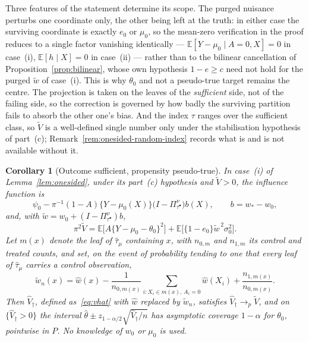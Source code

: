 \documentclass[11pt]{article}
\theoremstyle{plain}
\newtheorem{corollary}[theorem]{Corollary}
\theoremstyle{definition}
\theoremstyle{remark}
\newcommand{\E}{\mathbb{E}}
\newcommand{\ez}{e_0}
\newcommand{\mz}{\mu_0}
\newcommand{\wz}{w_0}
\newcommand{\what}{\widehat{w}}
\newcommand{\that}{\widehat{\tau}}
\newcommand{\thetahat}{\widehat{\theta}}
\newcommand{\Vhat}{\widehat{V}}
\newcommand{\wtil}{\widetilde{w}}
\newcommand{\Vtil}{\widetilde{V}}
\begin{document}
\noindent Three features of the statement determine its scope. The purged
nuisance perturbs one coordinate only, the other being left at the truth: in
either case the surviving coordinate is exactly $\ez$ or $\mz$, so the mean-zero
verification in the proof reduces to a single factor vanishing identically ---
$\E[Y-\mz\mid A=0,X]=0$ in case~(i), $\E[h\mid X]=0$ in case~(ii) --- rather than
to the bilinear cancellation of Proposition~\ref{prop:bilinear}, whose own
hypothesis $1-e\ge c$ need not hold for the purged $\wtil$ of case~(i). This is
why $\theta_0$ and not a pseudo-true target remains the
centre. The projection is taken on the leaves of the \emph{sufficient} side, not
of the failing side, so the correction is governed by how badly the surviving
partition fails to absorb the other one's bias. And the index $\tau$ ranges over
the sufficient class, so $\Vtil$ is a well-defined single number only under the
stabilisation hypothesis of part~(c); Remark~\ref{rem:onesided-random-index}
records what is and is not available without it.

\begin{corollary}[Outcome sufficient, propensity pseudo-true]
\label{cor:onesided-mu}
In case~(i) of Lemma~\ref{lem:onesided}, under its part~(c) hypothesis and
$\Vtil>0$, the
influence function is
\[
  \psi_0-\pi^{-1}(1-A)\{Y-\mz(X)\}
   \bigl(I-\Pi^\nu_{\tau^\bullet}\bigr)b(X),
  \qquad b=w_*-\wz,
\]
and, with $\wtil=\wz+(I-\Pi^\nu_{\tau^\bullet})b$,
\[
  \pi^2\Vtil=\E\bigl[A\{Y-\mz-\theta_0\}^2\bigr]
   +\E\bigl[\{1-\ez\}\wtil^{\,2}\sigma_0^2\bigr].
\]
Let $m(x)$ denote the leaf of $\that_\mu$ containing $x$, with $n_{0,m}$ and
$n_{1,m}$ its control and treated counts, and set, on the event of probability
tending to one that every leaf of $\that_\mu$ carries a control observation,
\[
  \wtil_n(x)=\what(x)
   -\frac1{n_{0,m(x)}}\sum_{i:X_i\in m(x),\,A_i=0}\what(X_i)
   +\frac{n_{1,m(x)}}{n_{0,m(x)}} .
\]
Then $\Vhat_\dagger$, defined as~\eqref{eq:vhat} with $\what$ replaced by $\wtil_n$,
satisfies $\Vhat_\dagger\to_p\Vtil$, and on $\{\Vhat_\dagger>0\}$ the interval
$\thetahat\pm z_{1-\alpha/2}\sqrt{\Vhat_\dagger/n}$ has asymptotic coverage $1-\alpha$
for $\theta_0$, pointwise in $P$. No knowledge of $\wz$ or $\mz$ is used.
\end{corollary}
\end{document}
